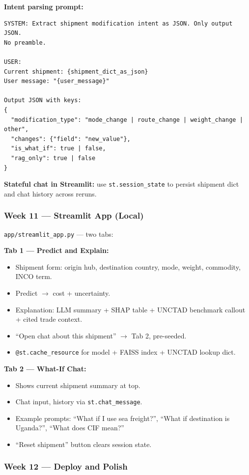 \documentclass[11pt, a4paper]{article}
\begin{document}
\textbf{Intent parsing prompt:}
\begin{lstlisting}
SYSTEM: Extract shipment modification intent as JSON. Only output JSON.
No preamble.

USER:
Current shipment: {shipment_dict_as_json}
User message: "{user_message}"

Output JSON with keys:
{
  "modification_type": "mode_change | route_change | weight_change | other",
  "changes": {"field": "new_value"},
  "is_what_if": true | false,
  "rag_only": true | false
}
\end{lstlisting}

\textbf{Stateful chat in Streamlit:} use \texttt{st.session\_state} to persist shipment dict and chat history across reruns.

\subsubsection*{Week 11 --- Streamlit App (Local)}

\texttt{app/streamlit\_app.py} --- two tabs:

\textbf{Tab 1 --- Predict and Explain:}
\begin{itemize}[noitemsep]
  \item Shipment form: origin hub, destination country, mode, weight, commodity, INCO term.
  \item Predict $\rightarrow$ cost + uncertainty.
  \item Explanation: LLM summary + SHAP table + UNCTAD benchmark callout + cited trade context.
  \item ``Open chat about this shipment'' $\rightarrow$ Tab 2, pre-seeded.
  \item \texttt{@st.cache\_resource} for model + FAISS index + UNCTAD lookup dict.
\end{itemize}

\textbf{Tab 2 --- What-If Chat:}
\begin{itemize}[noitemsep]
  \item Shows current shipment summary at top.
  \item Chat input, history via \texttt{st.chat\_message}.
  \item Example prompts: ``What if I use sea freight?'', ``What if destination is Uganda?'', ``What does CIF mean?''
  \item ``Reset shipment'' button clears session state.
\end{itemize}

\subsubsection*{Week 12 --- Deploy and Polish}
\end{document}
